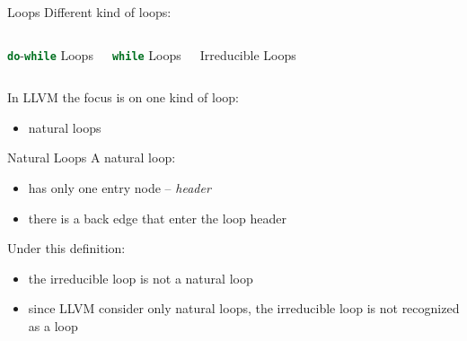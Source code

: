 \documentclass[10pt,mathserif]{beamer}
\newcommand{\cinline}[1]{\lstinline[language=C]!#1!}
\begin{document}
\begin{frame}{Loops}
Different kind of loops:

\begin{columns}[t]
\begin{block}{\cinline{do}-\cinline{while} Loops}
\centering

\end{block}

\begin{block}{\cinline{while} Loops}
\centering

\end{block}

\begin{block}{Irreducible Loops}
\centering

\end{block}
\end{columns}

\bigskip
In LLVM the focus is on one kind of loop:

\begin{itemize}
\item natural loops
\end{itemize}
\end{frame}

\begin{frame}{Natural Loops}
A natural loop:

\begin{itemize}
\item has only one entry node -- \emph{header}
\item there is a back edge that enter the loop header
\end{itemize}

\vfill
Under this definition:

\begin{itemize}
\item the irreducible loop is not a natural loop
\item since LLVM consider only natural loops, the irreducible loop \alert{is not
      recognized} as a loop
\end{itemize}
\end{frame}
\end{document}
